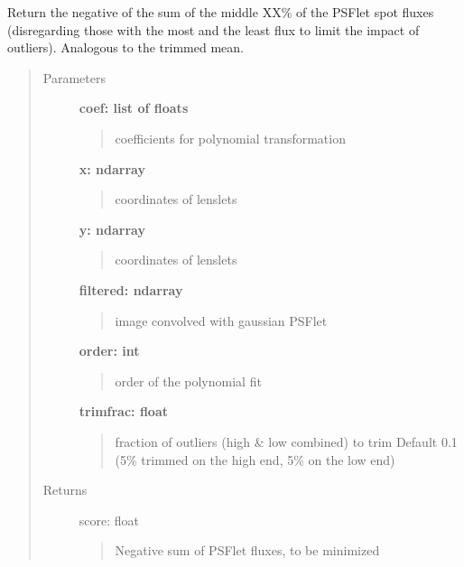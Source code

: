 \documentclass[letterpaper,10pt,english]{sphinxmanual}
\begin{document}
\begin{fulllineitems}
\label{tools:tools.locate_psflets.corrval}
Return the negative of the sum of the middle XX\% of the PSFlet
spot fluxes (disregarding those with the most and the least flux
to limit the impact of outliers).  Analogous to the trimmed mean.
\begin{quote}\begin{description}
\item[{Parameters}] \leavevmode
\textbf{coef:     list of floats}
\begin{quote}

coefficients for polynomial transformation
\end{quote}

\textbf{x: ndarray}
\begin{quote}

coordinates of lenslets
\end{quote}

\textbf{y: ndarray}
\begin{quote}

coordinates of lenslets
\end{quote}

\textbf{filtered: ndarray}
\begin{quote}

image convolved with gaussian PSFlet
\end{quote}

\textbf{order: int}
\begin{quote}

order of the polynomial fit
\end{quote}

\textbf{trimfrac: float}
\begin{quote}

fraction of outliers (high \& low combined) to trim 
Default 0.1 (5\% trimmed on the high end, 5\% on the low end)
\end{quote}

\item[{Returns}] \leavevmode
score:    float
\begin{quote}

Negative sum of PSFlet fluxes, to be minimized
\end{quote}

\end{description}\end{quote}

\end{fulllineitems}
\end{document}
